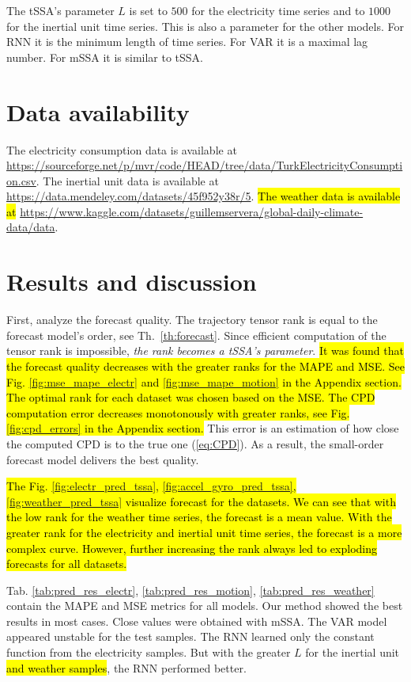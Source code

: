 \documentclass[referee, pdflatex, sn-mathphys-num]{sn-jnl}
\theoremstyle{definition}
\theoremstyle{plain}
\begin{document}
	The tSSA's parameter $ L $ is set to $ 500 $ for the electricity time series and to $ 1000 $ for the inertial unit time series. This is also a parameter for the other models. For RNN it is the minimum length of time series. For VAR it is a maximal lag number. For mSSA it is similar to tSSA.
	
	\section{Data availability}
	
	The electricity consumption data is available at \url{https://sourceforge.net/p/mvr/code/HEAD/tree/data/TurkElectricityConsumption.csv}. The inertial unit data is available at \url{https://data.mendeley.com/datasets/45f952y38r/5}. \hl{The weather data is available at} \url{https://www.kaggle.com/datasets/guillemservera/global-daily-climate-data/data}.
	
	\section{Results and discussion}
	
	First, analyze the forecast quality. The trajectory tensor rank is equal to the forecast model's order, see Th.~\ref{th:forecast}. Since efficient computation of the tensor rank is impossible, \emph{the rank becomes a tSSA's parameter}. \hl{It was found that the forecast quality decreases with the greater ranks for the MAPE and MSE. See Fig. {\ref{fig:mse_mape_electr}} and {\ref{fig:mse_mape_motion}} in the Appendix section. The optimal rank for each dataset was chosen based on the MSE. The CPD computation error decreases monotonously with greater ranks, see Fig. {\ref{fig:cpd_errors}} in the Appendix section.} This error is an estimation of how close the computed CPD is to the true one (\ref{eq:CPD}). As a result, the small-order forecast model delivers the best quality.
	
	\hl{The Fig. {\ref{fig:electr_pred_tssa}}, {\ref{fig:accel_gyro_pred_tssa}}, {\ref{fig:weather_pred_tssa}} visualize forecast for the datasets. We can see that with the low rank for the weather time series, the forecast is a mean value. With the greater rank for the electricity and inertial unit time series, the forecast is a more complex curve. However, further increasing the rank always led to exploding forecasts for all datasets.}
	
	Tab. \ref{tab:pred_res_electr}, \ref{tab:pred_res_motion}, \ref{tab:pred_res_weather} contain the MAPE and MSE metrics for all models. Our method showed the best results in most cases. Close values were obtained with mSSA. The VAR model appeared unstable for the test samples. The RNN learned only the constant function from the electricity samples. But with the greater $ L $ for the inertial unit \hl{and weather samples}, the RNN performed better.
	
\end{document}
